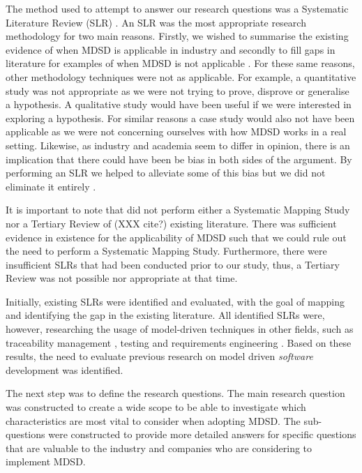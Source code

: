 \documentclass[10pt,twocolumn]{article}
\begin{document}
The method used to attempt to answer our research questions was a Systematic Literature Review (SLR) \cite{kitchenham2007guidelines}. An SLR was the most appropriate research methodology for two main reasons. Firstly, we wished to summarise the existing evidence of when MDSD is applicable in industry and secondly to fill gaps in literature for examples of when MDSD is not applicable \cite{kitchenham2007guidelines}. For these same reasons, other methodology techniques were not as applicable. For example, a quantitative study was not appropriate as we were not trying to prove, disprove or generalise a hypothesis. A qualitative study would have been useful if we were interested in exploring a hypothesis. For similar reasons a case study would also not have been applicable as we were not concerning ourselves with how MDSD works in a real setting. Likewise, as industry and academia seem to differ in opinion, there is an implication that there could have been be bias in both sides of the argument. By performing an SLR we helped to alleviate some of this bias but we did not eliminate it entirely \cite{kitchenham2007guidelines}.

It is important to note that did not perform either a Systematic Mapping Study nor a Tertiary Review of (XXX cite?) existing literature. There was sufficient evidence in existence for the applicability of MDSD such that we could rule out the need to perform a Systematic Mapping Study. Furthermore, there were insufficient SLRs that had been conducted prior to our study, thus, a Tertiary Review \cite{kitchenham2007guidelines} was not possible nor appropriate at that time.


Initially, existing SLRs were identified and evaluated, with the goal of mapping and identifying the gap in the existing literature. All identified SLRs \cite{santiago2012model} \cite{dias2007survey} \cite{loniewski2010systematic} \cite{nicolas2009generation} were, however, researching the usage of model-driven techniques in other fields, such as traceability management \cite{santiago2012model}, testing \cite{dias2007survey} and requirements engineering \cite{loniewski2010systematic} \cite{nicolas2009generation}. Based on these results, the need to evaluate previous research on model driven \textit{software} development was identified. 

The next step was to define the research questions. The main research question was constructed to create a wide scope to be able to investigate which characteristics are most vital to consider when adopting MDSD. The sub-questions were constructed to provide more detailed answers for specific questions that are valuable to the industry and companies who are considering to implement MDSD. 
\end{document}
